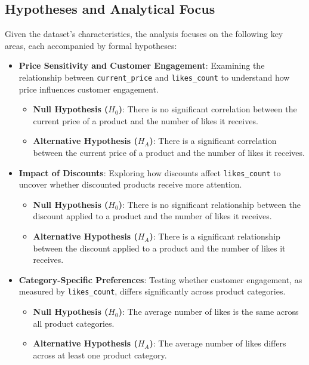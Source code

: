 \documentclass[a4paper,11pt]{article}
\begin{document}
\subsection{Hypotheses and Analytical Focus}

Given the dataset's characteristics, the analysis focuses on the following key areas, each accompanied by formal hypotheses:

\begin{itemize}
    \item \textbf{Price Sensitivity and Customer Engagement}: Examining the relationship between \texttt{current\_price} and \texttt{likes\_count} to understand how price influences customer engagement.
    \begin{itemize}
        \item \textbf{Null Hypothesis (\( H_0 \))}: There is no significant correlation between the current price of a product and the number of likes it receives.
        \item \textbf{Alternative Hypothesis (\( H_A \))}: There is a significant correlation between the current price of a product and the number of likes it receives.
    \end{itemize}
    
    \item \textbf{Impact of Discounts}: Exploring how discounts affect \texttt{likes\_count} to uncover whether discounted products receive more attention.
    \begin{itemize}
        \item \textbf{Null Hypothesis (\( H_0 \))}: There is no significant relationship between the discount applied to a product and the number of likes it receives.
        \item \textbf{Alternative Hypothesis (\( H_A \))}: There is a significant relationship between the discount applied to a product and the number of likes it receives.
    \end{itemize}
    
    \item \textbf{Category-Specific Preferences}: Testing whether customer engagement, as measured by \texttt{likes\_count}, differs significantly across product categories.
    \begin{itemize}
        \item \textbf{Null Hypothesis (\( H_0 \))}: The average number of likes is the same across all product categories.
        \item \textbf{Alternative Hypothesis (\( H_A \))}: The average number of likes differs across at least one product category.
    \end{itemize}
\end{itemize}
\end{document}
